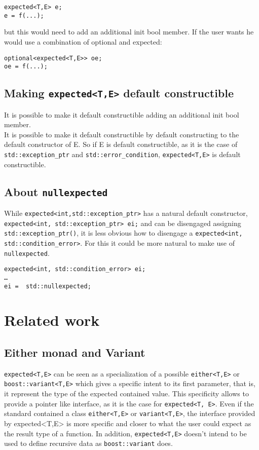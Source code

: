 \documentclass[a4paper,10pt]{article}
\newcommand{\cpp}[1]{\lstinline{#1}}
\begin{document}
\begin{lstlisting}
expected<T,E> e;
e = f(...);
\end{lstlisting}

but this would need to add an additional init bool member. If the user wants he would use a combination of optional and expected:

\begin{lstlisting}
optional<expected<T,E>> oe;
oe = f(...);
\end{lstlisting}

\subsection{Making \cpp{expected<T,E>} default constructible}

It is possible to make it default constructible adding an additional init bool member. \\
It is possible to make it default constructible by default constructing to the default constructor of E. So if  E is default constructible, as it is the case of \cpp{std::exception_ptr} and \cpp{std::error_condition}, \cpp{expected<T,E>} is default constructible.

\subsection{About \cpp{nullexpected}}
While \cpp{expected<int,std::exception_ptr>} has a natural default constructor, \cpp{expected<int, std::exception_ptr> ei;}
and can be disengaged assigning \cpp{std::exception_ptr()}, it is less obvious how to disengage a \cpp{expected<int, std::condition_error>}. For this it could be more natural to make use of \cpp{nullexpected}.

\begin{lstlisting}
expected<int, std::condition_error> ei;
…
ei =  std::nullexpected;
\end{lstlisting}

\section{Related work}

\subsection{Either monad and Variant}

\cpp{expected<T,E>} can be seen as a specialization of a possible \cpp{either<T,E>} or \cpp{boost::variant<T,E>} which gives a specific intent to its first parameter, that is, it represent the type of the expected contained value. This specificity allows to provide a pointer like interface, as it is the case for \cpp{expected<T, E>}. Even if the standard contained a class \cpp{either<T,E>} or \cpp{variant<T,E>}, the interface provided by expected<T,E> is more specific and closer to what the user could expect as the result type of a function. In addition, \cpp{expected<T,E>} doesn't intend to be used to define recursive data as \cpp{boost::variant} does.
\end{document}
